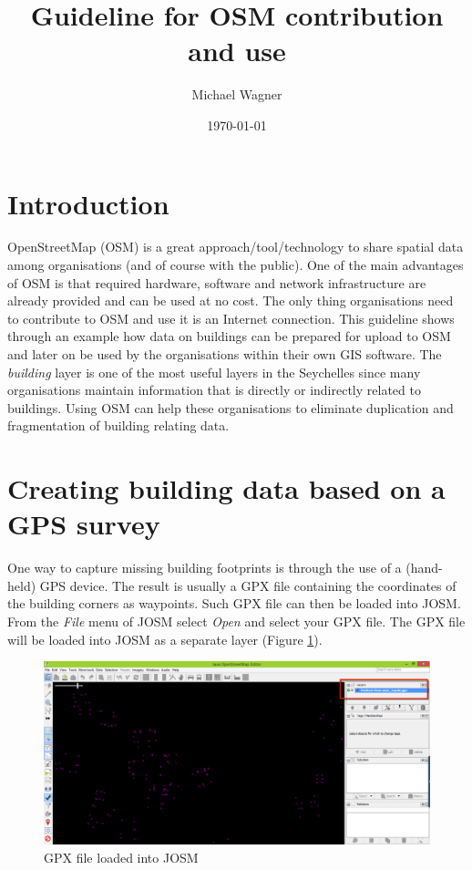 \documentclass[a4paper,12pt,titlepage]{article}
\title{Guideline for OSM contribution and use}
\author{Michael Wagner}
\date{\today}
\begin{document}
\maketitle

\tableofcontents
\listoffigures
\newpage

\section{Introduction}

OpenStreetMap (OSM) is a great approach/tool/technology to share spatial data among organisations (and of course with the public). One of the main advantages of OSM is that required hardware, software and network infrastructure are already provided and can be used at no cost. The only thing organisations need to contribute to OSM and use it is an Internet connection.
This guideline shows through an example how data on buildings can be prepared for upload to OSM and later on be used by the organisations within their own GIS software. The \textit{building} layer is one of the most useful layers in the Seychelles since many organisations maintain information that is directly or indirectly related to buildings. Using OSM can help these organisations to eliminate duplication and fragmentation of building relating data.

\section{Creating building data based on a GPS survey}

One way to capture missing building footprints is through the use of a (hand-held) GPS device. The result is usually a GPX file containing the coordinates of the building corners as waypoints. Such GPX file can then be loaded into JOSM. From the \textit{File} menu of JOSM select \textit{Open} and select your GPX file. The GPX file will be loaded into JOSM as a separate layer (Figure \ref{fig:load_gpx}).

\begin{figure}[H]
\centering
\includegraphics[width=12cm]{Images/load_gpx_file.png}
\caption{GPX file loaded into JOSM}\label{fig:load_gpx}
\end{figure}
\end{document}
